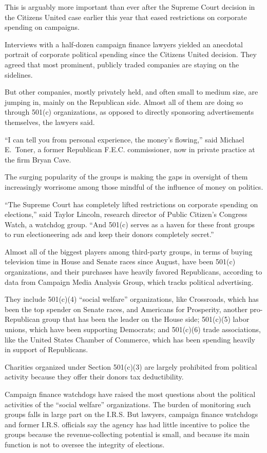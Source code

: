 ﻿\documentclass[12pt]{article}
\begin{document}
This is arguably more important than ever after the Supreme Court decision in the Citizens United
case earlier this year that eased restrictions on corporate spending on campaigns.

Interviews with a half-dozen campaign finance lawyers yielded an anecdotal portrait of corporate
political spending since the Citizens United decision. They agreed that most prominent, publicly
traded companies are staying on the sidelines.

But other companies, mostly privately held, and often small to medium size, are jumping in, mainly
on the Republican side. Almost all of them are doing so through 501(c) organizations, as opposed to
directly sponsoring advertisements themselves, the lawyers said.

``I can tell you from personal experience, the money's flowing,'' said Michael E.~Toner, a former
Republican F.E.C. commissioner, now in private practice at the firm Bryan Cave.

The surging popularity of the groups is making the gaps in oversight of them increasingly worrisome
among those mindful of the influence of money on politics.

``The Supreme Court has completely lifted restrictions on corporate spending on elections,'' said
Taylor Lincoln, research director of Public Citizen's Congress Watch, a watchdog group. ``And 501(c)
serves as a haven for these front groups to run electioneering ads and keep their donors completely
secret.''

Almost all of the biggest players among third-party groups, in terms of buying television time in
House and Senate races since August, have been 501(c) organizations, and their purchases have
heavily favored Republicans, according to data from Campaign Media Analysis Group, which tracks
political advertising.

They include 501(c)(4) ``social welfare'' organizations, like Crossroads, which has been the top
spender on Senate races, and Americans for Prosperity, another pro-Republican group that has been
the leader on the House side; 501(c)(5) labor unions, which have been supporting Democrats; and
501(c)(6) trade associations, like the United States Chamber of Commerce, which has been spending
heavily in support of Republicans.

Charities organized under Section 501(c)(3) are largely prohibited from political activity because
they offer their donors tax deductibility.

Campaign finance watchdogs have raised the most questions about the political activities of the
``social welfare'' organizations. The burden of monitoring such groups falls in large part on the
I.R.S. But lawyers, campaign finance watchdogs and former I.R.S. officials say the agency has had
little incentive to police the groups because the revenue-collecting potential is small, and because
its main function is not to oversee the integrity of elections.
\end{document}
